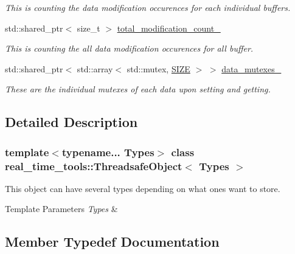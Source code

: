 \begin{DoxyCompactItemize}
\begin{DoxyCompactList}\small\item\em This is counting the data modification occurences for each individual buffers. \end{DoxyCompactList}\item 
std\+::shared\+\_\+ptr$<$ size\+\_\+t $>$ \hyperlink{classreal__time__tools_1_1ThreadsafeObject_a12f866f5a2f955aa3b55b03623033fca}{total\+\_\+modification\+\_\+count\+\_\+}
\begin{DoxyCompactList}\small\item\em This is counting the all data modification occurences for all buffer. \end{DoxyCompactList}\item 
\mbox{\label{classreal__time__tools_1_1ThreadsafeObject_a8a4e122257d25cf42a389c56daf41cb7}} 
std\+::shared\+\_\+ptr$<$ std\+::array$<$ std\+::mutex, \hyperlink{classreal__time__tools_1_1ThreadsafeObject_af05c02b66f0b75ea12cde9274bc2a97d}{S\+I\+ZE} $>$ $>$ \hyperlink{classreal__time__tools_1_1ThreadsafeObject_a8a4e122257d25cf42a389c56daf41cb7}{data\+\_\+mutexes\+\_\+}
\begin{DoxyCompactList}\small\item\em These are the individual mutexes of each data upon setting and getting. \end{DoxyCompactList}\end{DoxyCompactItemize}


\subsection{Detailed Description}
\subsubsection*{template$<$typename... Types$>$\newline
class real\+\_\+time\+\_\+tools\+::\+Threadsafe\+Object$<$ Types $>$}

This object can have several types depending on what ones want to store. 


\begin{DoxyTemplParams}{Template Parameters}
{\em Types} & \\
\hline
\end{DoxyTemplParams}


\subsection{Member Typedef Documentation}
\mbox{\label{classreal__time__tools_1_1ThreadsafeObject_afcbd77df1964d4fe606f1e776f1ff9b8}} 
